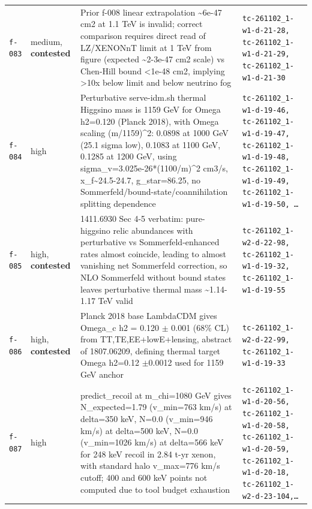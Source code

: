 \documentclass[11pt,a4paper]{article}
\begin{document}
\begin{longtable}{@{}p{}p{}p{}p{}@{}}
\texttt{f-083} & medium, \textbf{contested} & Prior f-008 linear extrapolation \textasciitilde{}6e-47 cm2 at 1.1 TeV is invalid; correct comparison requires direct read of LZ/XENONnT limit at 1 TeV from figure (expected \textasciitilde{}2-3e-47 cm2 scale) vs Chen-Hill bound \textless{}1e-48 cm2, implying \textgreater{}10x below limit and below neutrino fog & \texttt{tc-261102\_\allowbreak{}1-w1-d-21-28,\allowbreak{} tc-261102\_\allowbreak{}1-w1-d-21-29,\allowbreak{} tc-261102\_\allowbreak{}1-w1-d-21-30} \\
\texttt{f-084} & high & Perturbative serve-idm.sh thermal Higgsino mass is 1159 GeV for Omega h2=0.120 (Planck 2018), with Omega scaling (m/1159)\textasciicircum{}2: 0.0898 at 1000 GeV (25.1 sigma low), 0.1083 at 1100 GeV, 0.1285 at 1200 GeV, using sigma\_v=3.025e-26*(1100/m)\textasciicircum{}2 cm3/s, x\_f\textasciitilde{}24.5-24.7, g\_star=86.25, no Sommerfeld/bound-state/coannihilation splitting dependence & \texttt{tc-261102\_\allowbreak{}1-w1-d-19-46,\allowbreak{} tc-261102\_\allowbreak{}1-w1-d-19-47,\allowbreak{} tc-261102\_\allowbreak{}1-w1-d-19-48,\allowbreak{} tc-261102\_\allowbreak{}1-w1-d-19-49,\allowbreak{} tc-261102\_\allowbreak{}1-w1-d-19-50,\allowbreak{} \ldots{}\allowbreak{}} \\
\texttt{f-085} & high, \textbf{contested} & 1411.6930 Sec 4-5 verbatim: pure-higgsino relic abundances with perturbative vs Sommerfeld-enhanced rates almost coincide, leading to almost vanishing net Sommerfeld correction, so NLO Sommerfeld without bound states leaves perturbative thermal mass \textasciitilde{}1.14-1.17 TeV valid & \texttt{tc-261102\_\allowbreak{}1-w2-d-22-98,\allowbreak{} tc-261102\_\allowbreak{}1-w1-d-19-32,\allowbreak{} tc-261102\_\allowbreak{}1-w1-d-19-55} \\
\texttt{f-086} & high, \textbf{contested} & Planck 2018 base LambdaCDM gives Omega\_c h2 = 0.120 $\pm$ 0.001 (68\% CL) from TT,TE,EE+lowE+lensing, abstract of 1807.06209, defining thermal target Omega h2=0.12 $\pm$0.0012 used for 1159 GeV anchor & \texttt{tc-261102\_\allowbreak{}1-w2-d-22-99,\allowbreak{} tc-261102\_\allowbreak{}1-w1-d-19-33} \\
\texttt{f-087} & high & predict\_recoil at m\_chi=1080 GeV gives N\_expected=1.79 (v\_min=763 km/s) at delta=350 keV, N=0.0 (v\_min=946 km/s) at delta=500 keV, N=0.0 (v\_min=1026 km/s) at delta=566 keV for 248 keV recoil in 2.84 t-yr xenon, with standard halo v\_max=776 km/s cutoff; 400 and 600 keV points not computed due to tool budget exhaustion & \texttt{tc-261102\_\allowbreak{}1-w1-d-20-56,\allowbreak{} tc-261102\_\allowbreak{}1-w1-d-20-58,\allowbreak{} tc-261102\_\allowbreak{}1-w1-d-20-59,\allowbreak{} tc-261102\_\allowbreak{}1-w1-d-20-18,\allowbreak{} tc-261102\_\allowbreak{}1-w2-d-23-104,\allowbreak{}\ldots{}\allowbreak{}} \\

\end{longtable}
\end{document}
